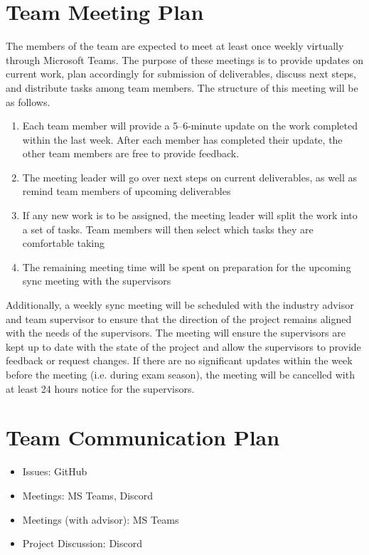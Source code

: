 \documentclass{article}
\begin{document}
\section{Team Meeting Plan}
\begin{flushleft}
The members of the team are expected to meet at least once weekly virtually through Microsoft Teams.
The purpose of these meetings is to provide updates on current work, plan accordingly for submission of deliverables, discuss next steps, and distribute tasks among team members.
The structure of this meeting will be as follows.
  \begin{enumerate}
    \item Each team member will provide a 5–6-minute update on the work completed within the last week. After each member has completed their update, the other team members are free to provide feedback.
    \item The meeting leader will go over next steps on current deliverables, as well as remind team members of upcoming deliverables
    \item If any new work is to be assigned, the meeting leader will split the work into a set of tasks. Team members will then select which tasks they are comfortable taking
    \item The remaining meeting time will be spent on preparation for the upcoming sync meeting with the supervisors
  \end{enumerate}
Additionally, a weekly sync meeting will be scheduled with the industry advisor and team supervisor to ensure that the direction of the project remains aligned with the needs of the supervisors.
The meeting will ensure the supervisors are kept up to date with the state of the project and allow the supervisors to provide feedback or request changes.
If there are no significant updates within the week before the meeting (i.e. during exam season), the meeting will be cancelled with at least 24 hours notice for the supervisors.
\end{flushleft}

\section{Team Communication Plan}

\begin{itemize}
  \item Issues: GitHub
  \item Meetings: MS Teams, Discord
  \item Meetings (with advisor): MS Teams
  \item Project Discussion: Discord
\end{itemize}
\end{document}
